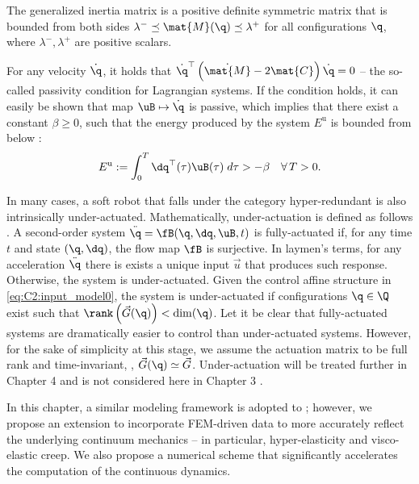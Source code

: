 \begin{asm}
The generalized inertia matrix is a positive definite symmetric matrix that is bounded from both sides $\lambda^{-} \preceq \mat{M}(\q) \preceq \lambda^{+}$ for all configurations $\q$, where $\lambda^{-},\lambda^{+}$ are positive scalars.
\end{asm}

\begin{asm}[Passivity]
For any velocity $\dot{\q}$, it holds that $\dot{\q}^\top\left(\dot{\mat{M}} - 2\mat{C}  \right)\dot{\q} = 0$ -- the so-called passivity condition for Lagrangian systems. If the condition holds, it can easily be shown that map $\uB \mapsto \dot{\q}$ is passive, which implies that there exist a constant $\beta \ge 0$, such that the energy produced by the system $E^{\textrm{u}}$ is bounded from below \cite{Ortega1998}:
%
\begin{equation}
E^{\textrm{u}} := \int_0^T \dq^\top(\tau) \uB(\tau) \;d\tau > -\beta \quad \forall\,T > 0.
\label{as:C2:passivity}
\end{equation}
%
\end{asm}

\begin{asm}
In many cases, a soft robot that falls under the category hyper-redundant is also intrinsically under-actuated. Mathematically, under-actuation is defined as follows \cite{Russ2022}. A second-order system $\ddot{\q} = \fB(\q,\dq,\uB,t)$ is fully-actuated if, for any time $t$ and state $(\q,\dq)$, the flow map $\fB$ is surjective. In laymen's terms, for any acceleration $\ddot{\q}$ there is exists a unique input $\vec{u}$ that produces such response. Otherwise, the system is under-actuated. Given the control affine structure in \eqref{eq:C2:input_model0}, the system is under-actuated if configurations $\q \in \Q$ exist such that $\rank \left( \vec{G}(\q) \right) < \dim(\q)$. Let it be clear that fully-actuated systems are dramatically easier to control than under-actuated systems. However, for the sake of simplicity at this stage, we assume the actuation matrix to be full rank and time-invariant, \ie, $\vec{G}(\q) \simeq \vec{G}$. Under-actuation will be treated further in Chapter 4 and \editl is not considered here in Chapter 3 \editr.
\end{asm}

In this chapter, a similar modeling framework is adopted to \cite{Mochiyama2003}; however, we propose an extension to incorporate FEM-driven data to more accurately reflect the underlying continuum mechanics -- in particular, hyper-elasticity and visco-elastic creep. We also propose a numerical scheme that significantly accelerates the computation of the continuous dynamics.

